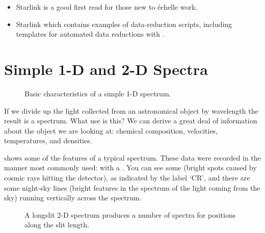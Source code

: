 \begin{itemize}

\item Starlink  is a good first read for those new to
\'{e}chelle work.

\item Starlink  which contains examples of
data-reduction scripts, including templates for automated data
reductions with \cite{echomop}\@.

\end{itemize}


\section{Simple 1-D and 2-D Spectra}

\begin{figure}
\begin{center}
{\leavevmode\epsfysize=136mm}

\parbox{140mm}{
\caption{Basic characteristics of a simple 1-D spectrum.}
\label{fi_simple_spectrum}
}
\end{center}
\end{figure}

If we divide up the light collected from an astronomical object by
wavelength the result is a spectrum.  What use is this?  We can derive
a great deal of information about the object we are looking at: chemical
composition, velocities, temperatures, and densities.

shows some of the features of a typical spectrum.
These data were recorded in the manner most commonly used: with a
.
You can see some 
(bright spots caused by cosmic rays hitting the detector),
as indicated by the label `CR', and
there are some night-sky lines (bright features in the spectrum of
the light coming from the sky) running vertically across the spectrum.


\begin{figure}
\begin{center}
{\leavevmode\epsfysize=136mm}

\parbox{140mm}{
\caption{A longslit 2-D spectrum produces a number of spectra for
positions along the slit length.}
\label{fi_twod_spectrum}
}
\end{center}
\end{figure}

